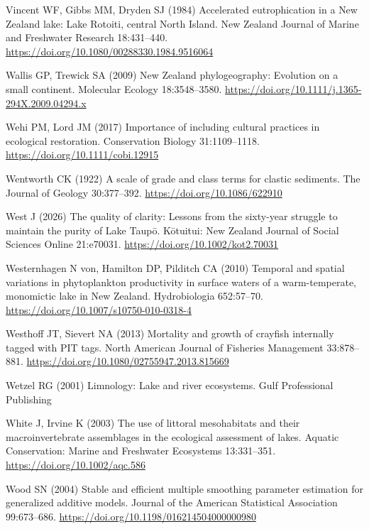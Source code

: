 \documentclass[
  12pt,
  a4paper,
  oneside]{scrbook}
\newlength{\cslhangindent}
\newenvironment{CSLReferences}[2] %
 {\begin{list}{}{%
  \setlength{\itemindent}{0pt}
  \setlength{\leftmargin}{0pt}
  \setlength{\parsep}{0pt}
  \ifodd #1
   \setlength{\leftmargin}{\cslhangindent}
   \setlength{\itemindent}{-1\cslhangindent}
  \fi
  \setlength{\itemsep}{#2\baselineskip}}}
 {\end{list}}
\renewenvironment{CSLReferences}[2]
   {\begin{list}{}{%
    \setlength{\itemindent}{0pt}
    \setlength{\leftmargin}{0pt}
    \setlength{\parsep}{0pt}
    \ifodd #1
     \setlength{\leftmargin}{\cslhangindent}
     \setlength{\itemindent}{-1\cslhangindent}
    \fi
    \setlength{\itemsep}{0.3\baselineskip}}}
   {\end{list}}%
\begin{document}
\begin{CSLReferences}{1}{1}
Vincent WF, Gibbs MM, Dryden SJ (1984) Accelerated eutrophication in a
{New Zealand} lake: {Lake Rotoiti, central North Island}. New Zealand
Journal of Marine and Freshwater Research 18:431--440.
\url{https://doi.org/10.1080/00288330.1984.9516064}

Wallis GP, Trewick SA (2009) {New Zealand} phylogeography: Evolution on
a small continent. Molecular Ecology 18:3548--3580.
\url{https://doi.org/10.1111/j.1365-294X.2009.04294.x}

Wehi PM, Lord JM (2017) Importance of including cultural practices in
ecological restoration. Conservation Biology 31:1109--1118.
\url{https://doi.org/10.1111/cobi.12915}

Wentworth CK (1922) A scale of grade and class terms for clastic
sediments. The Journal of Geology 30:377--392.
\url{https://doi.org/10.1086/622910}

West J (2026) The quality of clarity: Lessons from the sixty-year
struggle to maintain the purity of {Lake Taupō}. Kōtuitui: New Zealand
Journal of Social Sciences Online 21:e70031.
\url{https://doi.org/10.1002/kot2.70031}

Westernhagen N von, Hamilton DP, Pilditch CA (2010) Temporal and spatial
variations in phytoplankton productivity in surface waters of a
warm-temperate, monomictic lake in {New Zealand}. Hydrobiologia
652:57--70. \url{https://doi.org/10.1007/s10750-010-0318-4}

Westhoff JT, Sievert NA (2013) Mortality and growth of crayfish
internally tagged with {PIT} tags. North American Journal of Fisheries
Management 33:878--881.
\url{https://doi.org/10.1080/02755947.2013.815669}

Wetzel RG (2001) Limnology: Lake and river ecosystems. Gulf Professional
Publishing

White J, Irvine K (2003) The use of littoral mesohabitats and their
macroinvertebrate assemblages in the ecological assessment of lakes.
Aquatic Conservation: Marine and Freshwater Ecosystems 13:331--351.
\url{https://doi.org/10.1002/aqc.586}

Wood SN (2004) Stable and efficient multiple smoothing parameter
estimation for generalized additive models. Journal of the American
Statistical Association 99:673--686.
\url{https://doi.org/10.1198/016214504000000980}


\end{CSLReferences}
\end{document}
